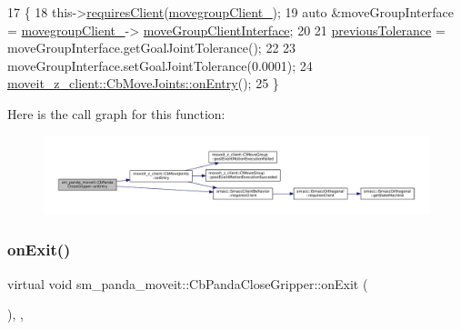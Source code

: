 \begin{DoxyCode}
17     \{
18         this->\hyperlink{classsmacc_1_1SmaccClientBehavior_a917f001e763a1059af337bf4e164f542}{requiresClient}(\hyperlink{classmoveit__z__client_1_1CbMoveJoints_a2ce2e613b676025766dcd2f01ae50810}{movegroupClient\_});
19         \textcolor{keyword}{auto} &moveGroupInterface = \hyperlink{classmoveit__z__client_1_1CbMoveJoints_a2ce2e613b676025766dcd2f01ae50810}{movegroupClient\_}->
      \hyperlink{classmoveit__z__client_1_1ClMoveGroup_af86e046b837be0ef4afa9893d8808f20}{moveGroupClientInterface};
20 
21         \hyperlink{classsm__panda__moveit_1_1CbPandaCloseGripper_adb4d41d62eb40ca626f9d21bbec147a0}{previousTolerance} = moveGroupInterface.getGoalJointTolerance();
22 
23         moveGroupInterface.setGoalJointTolerance(0.0001);
24         \hyperlink{classmoveit__z__client_1_1CbMoveJoints_a512e97e94ab05ee12837433e5d921095}{moveit\_z\_client::CbMoveJoints::onEntry}();
25     \}
\end{DoxyCode}
Here is the call graph for this function\+:
\nopagebreak
\begin{figure}[H]
\begin{center}
\leavevmode
\includegraphics[width=350pt]{classsm__panda__moveit_1_1CbPandaCloseGripper_a755e506a4c47ec5f1485f2526c8a9e16_cgraph}
\end{center}
\end{figure}
\mbox{\label{classsm__panda__moveit_1_1CbPandaCloseGripper_a0a51d63684baaba9d33fe272db237593}} 
\subsubsection{\texorpdfstring{on\+Exit()}{onExit()}}
{\footnotesize\ttfamily virtual void sm\+\_\+panda\+\_\+moveit\+::\+Cb\+Panda\+Close\+Gripper\+::on\+Exit (\begin{DoxyParamCaption}{ }\end{DoxyParamCaption})\hspace{0.3cm}{\ttfamily [inline]}, {\ttfamily [override]}, {\ttfamily [virtual]}}




